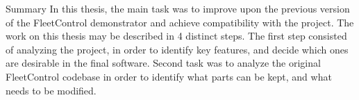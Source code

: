 \chap Summary
In this thesis, the main task was to improve upon the previous version of the FleetControl demonstrator and achieve compatibility with the {\mapfIR} project. 
The work on this thesis may be described in 4 distinct steps.\br
The first step consisted of analyzing the {\mapfIR} project, in order to identify key features, and decide which ones are desirable in the final software.
\br
Second task was to analyze the original FleetControl codebase in order to identify what parts can be kept, and what needs to be modified.
\br
 